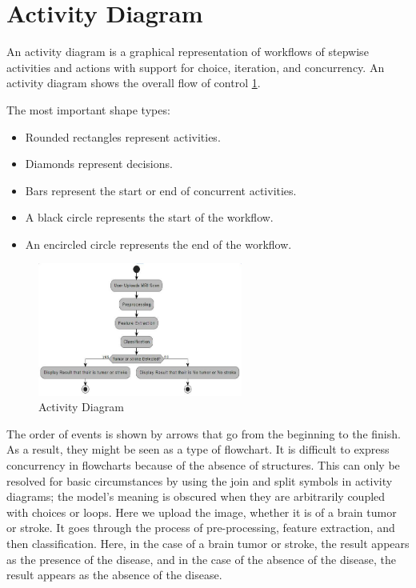 \section{Activity Diagram}

An activity diagram is a graphical representation of workflows of stepwise activities and actions with support for choice, iteration, and concurrency. An activity diagram shows the overall flow of control \ref{fig:activity_example}. 

The most important shape types: 
\begin{itemize}
    \item Rounded rectangles represent activities.
    \item Diamonds represent decisions. 
    \item Bars represent the start or end of concurrent activities. 
    \item A black circle represents the start of the workflow. 
    \item An encircled circle represents the end of the workflow. 
\end{itemize}


\begin{figure}
    \centering
    \includegraphics[width=0.60\textwidth]{Img/Chap-01/12.jpg}
    \caption{Activity Diagram}
    \label{fig:activity_example}
\end{figure}

The order of events is shown by arrows that go from the beginning to the finish. As a result, they might be seen as a type of flowchart. It is difficult to express concurrency in flowcharts because of the absence of structures. This can only be resolved for basic 
circumstances by using the join and split symbols in activity diagrams; the model's meaning is obscured when they are arbitrarily coupled with choices or loops. 
Here we upload the image, whether it is of a brain tumor or stroke. It goes through the process of pre-processing, feature extraction, and then classification. Here, in the case of a brain tumor or stroke, the result appears as the presence of the disease, and in the case of the absence of the disease, the result appears as the absence of the disease.

